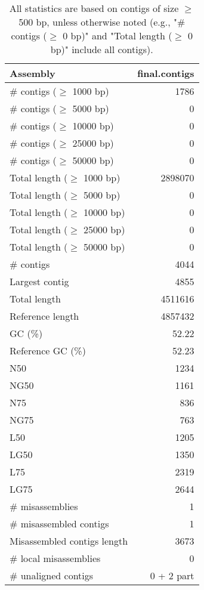 \documentclass[12pt,a4paper]{article}
\begin{document}
\begin{table}[ht]
\begin{center}
\caption{All statistics are based on contigs of size $\geq$ 500 bp, unless otherwise noted (e.g., "\# contigs ($\geq$ 0 bp)" and "Total length ($\geq$ 0 bp)" include all contigs).}
\begin{tabular}{|l*{1}{|r}|}
\hline
Assembly & final.contigs \\ \hline
\# contigs ($\geq$ 1000 bp) & 1786 \\ \hline
\# contigs ($\geq$ 5000 bp) & 0 \\ \hline
\# contigs ($\geq$ 10000 bp) & 0 \\ \hline
\# contigs ($\geq$ 25000 bp) & 0 \\ \hline
\# contigs ($\geq$ 50000 bp) & 0 \\ \hline
Total length ($\geq$ 1000 bp) & 2898070 \\ \hline
Total length ($\geq$ 5000 bp) & 0 \\ \hline
Total length ($\geq$ 10000 bp) & 0 \\ \hline
Total length ($\geq$ 25000 bp) & 0 \\ \hline
Total length ($\geq$ 50000 bp) & 0 \\ \hline
\# contigs & 4044 \\ \hline
Largest contig & 4855 \\ \hline
Total length & 4511616 \\ \hline
Reference length & 4857432 \\ \hline
GC (\%) & 52.22 \\ \hline
Reference GC (\%) & 52.23 \\ \hline
N50 & 1234 \\ \hline
NG50 & 1161 \\ \hline
N75 & 836 \\ \hline
NG75 & 763 \\ \hline
L50 & 1205 \\ \hline
LG50 & 1350 \\ \hline
L75 & 2319 \\ \hline
LG75 & 2644 \\ \hline
\# misassemblies & 1 \\ \hline
\# misassembled contigs & 1 \\ \hline
Misassembled contigs length & 3673 \\ \hline
\# local misassemblies & 0 \\ \hline
\# unaligned contigs & 0 + 2 part \\ \hline

\end{tabular}
\end{center}
\end{table}
\end{document}
